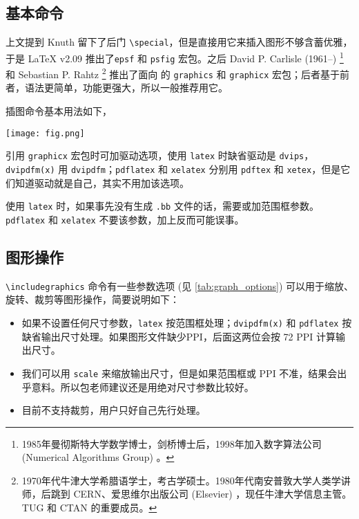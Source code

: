 \subsection{基本命令}

上文提到 Knuth 留下了后门 \verb|\special|，但是直接用它来插入图形不够含蓄优雅，于是 \LaTeX{} v2.09 推出了\texttt{epsf} 和 \texttt{psfig} 宏包。之后 David P. Carlisle (1961--)\indexCarlisle{} \footnote{1985年曼彻斯特大学数学博士，剑桥博士后，1998年加入数字算法公司 (Numerical Algorithms Group) 。} 和 Sebastian P. Rahtz\indexRahtz{} \footnote{1970年代牛津大学希腊语学士，考古学硕士。1980年代南安普敦大学人类学讲师，后跳到 CERN、爱思维尔出版公司 (Elsevier) ，现任牛津大学信息主管。TUG 和 CTAN 的重要成员。} 推出了面向 \LaTeXe 的 \texttt{graphics} 和 \texttt{graphicx} 宏包；后者基于前者，语法更简单，功能更强大，所以一般推荐用它。

插图命令基本用法如下，

\begin{Code}[]
\usepackage[dvipdfm]{graphicx}
\texttt{[image: fig.png]}
\end{Code}

引用 \texttt{graphicx} 宏包时可加驱动选项，使用 \texttt{latex} 时缺省驱动是 \texttt{dvips}，\texttt{dvipdfm(x)} 用 \texttt{dvipdfm}；\texttt{pdflatex} 和 \texttt{xelatex} 分别用 \texttt{pdftex} 和 \texttt{xetex}，但是它们知道驱动就是自己，其实不用加该选项。

使用 \texttt{latex} 时，如果事先没有生成 \texttt{.bb} 文件的话，需要或加范围框参数。\texttt{pdflatex} 和 \texttt{xelatex} 不要该参数，加上反而可能误事。

\subsection{图形操作}

\verb|\includegraphics| 命令有一些参数选项 (见 \autoref{tab:graph_options}) 可以用于缩放、旋转、裁剪等图形操作，简要说明如下：

\begin{itemize}
\item 如果不设置任何尺寸参数，\texttt{latex} 按范围框处理；\texttt{dvipdfm(x)} 和 \texttt{pdflatex} 按缺省输出尺寸处理。如果图形文件缺少PPI，后面这两位会按 72 PPI 计算输出尺寸。
\item 我们可以用 \texttt{scale} 来缩放输出尺寸，但是如果范围框或 PPI 不准，结果会出乎意料。所以包老师建议还是用绝对尺寸参数比较好。
\item \XeTeX 目前不支持裁剪，用户只好自己先行处理。
\end{itemize}

